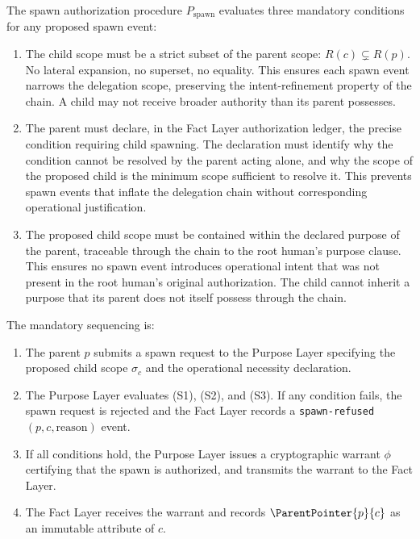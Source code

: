 The spawn authorization procedure $P_{\mathrm{spawn}}$ evaluates three mandatory conditions for any proposed spawn event:

\begin{enumerate}
    \item[(S1) \textbf{Scope refinement.}] The child scope must be a strict subset of the parent scope: $R(c) \subsetneq R(p)$. No lateral expansion, no superset, no equality. This ensures each spawn event narrows the delegation scope, preserving the intent-refinement property of the chain. A child may not receive broader authority than its parent possesses.

    \item[(S2) \textbf{Operational necessity.}] The parent must declare, in the Fact Layer authorization ledger, the precise condition requiring child spawning. The declaration must identify why the condition cannot be resolved by the parent acting alone, and why the scope of the proposed child is the minimum scope sufficient to resolve it. This prevents spawn events that inflate the delegation chain without corresponding operational justification.

    \item[(S3) \textbf{Human intent alignment.}] The proposed child scope must be contained within the declared purpose of the parent, traceable through the chain to the root human's purpose clause. This ensures no spawn event introduces operational intent that was not present in the root human's original authorization. The child cannot inherit a purpose that its parent does not itself possess through the chain.
\end{enumerate}

The mandatory sequencing is:
\begin{enumerate}
    \item The parent $p$ submits a spawn request to the Purpose Layer specifying the proposed child scope $\sigma_c$ and the operational necessity declaration.
    \item The Purpose Layer evaluates (S1), (S2), and (S3). If any condition fails, the spawn request is rejected and the Fact Layer records a \texttt{spawn-refused}$(p, c, \text{reason})$ event.
    \item If all conditions hold, the Purpose Layer issues a cryptographic warrant $\phi$ certifying that the spawn is authorized, and transmits the warrant to the Fact Layer.
    \item The Fact Layer receives the warrant and records $\ParentPointer{p}{c}$ as an immutable attribute of $c$.
\end{enumerate}

